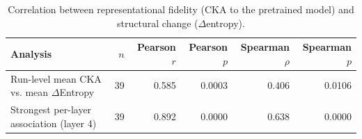 \begin{table}[t]
\centering
\caption{Correlation between representational fidelity (CKA to the pretrained model) and structural change ($\Delta$entropy).}
\label{tab:cka-entropy}
\small
\begin{tabular}{lrrrrr}
\toprule
Analysis & $n$ & Pearson $r$ & Pearson $p$ & Spearman $\rho$ & Spearman $p$ \\
\midrule
Run-level mean CKA vs. mean $\Delta$Entropy & 39 & 0.585 & 0.0003 & 0.406 & 0.0106 \\
Strongest per-layer association (layer 4) & 39 & 0.892 & 0.0000 & 0.638 & 0.0000 \\
\bottomrule
\end{tabular}
\end{table}
